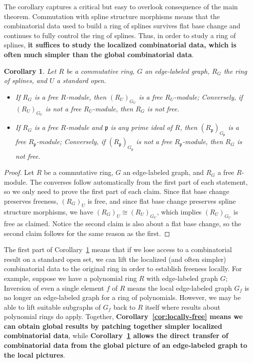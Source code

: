 \documentclass{article}
\newtheorem{corollary}{Corollary}
\begin{document}
The corollary captures a critical but easy to overlook consequence of the main theorem. Commutation with spline structure morphisms means that the combinatorial data used to build a ring of splines survives flat base change and continues to fully control the ring of splines. Thus, in order to study a ring of splines, \textbf{it suffices to study the localized combinatorial data, which is often much simpler than the global combinatorial data}.

\begin{corollary}
\label{cor:globally-free-implies-locally-free}
Let $R$ be a commutative ring, $G$ an edge-labeled graph, $R_G$ the ring of splines, and $U$ a standard open. 

\begin{itemize}
\item If $R_G$ is a free $R$-module, then $(R_U)_{G_U}$ is a free $R_U$-module; Conversely, if $(R_U)_{G_U}$ is not a free $R_U$-module, then $R_G$ is not free. 

\item If $R_G$ is a free $R$-module and $\mathfrak p$ is any prime ideal of $R$, then $(R_{\mathfrak p})_{G_{\mathfrak p}}$ is a free $R_{\mathfrak p}$-module; Conversely, if $(R_{\mathfrak p})_{G_{\mathfrak p}}$ is not a free $R_{\mathfrak p}$-module, then $R_G$ is not free.
\end{itemize}
\end{corollary}


\begin{proof}
Let $R$ be a commutative ring, $G$ an edge-labeled graph, and $R_G$ a free $R$-module. The converses follow automatically from the first part of each statement, so we only need to prove the first part of each claim. Since flat base change preserves freeness, $(R_G)_U$ is free, and since flat base change preserves spline structure morphisms, we have $(R_G)_U \cong (R_U)_{G_U}$, which implies $(R_U)_{G_U}$ is free as claimed. Notice the second claim is also about a flat base change, so the second claim follows for the same reason as the first. 
\end{proof}

The first part of Corollary~\ref{cor:globally-free-implies-locally-free} means that if we lose access to a combinatorial result on a standard open set, we can lift the localized (and often simpler) combinatorial data to the original ring in order to establish freeness locally. For example, suppose we have a polynomial ring $R$ with edge-labeled graph $G$; Inversion of even a single element $f$ of $R$ means the local edge-labeled graph $G_f$ is no longer an edge-labeled graph for a ring of polynomials. However, we may be able to lift suitable subgraphs of $G_f$ back to $R$ itself where results about polynomial rings do apply. Together, \textbf{Corollary~\ref{cor:locally-free} means we can obtain global results by patching together simpler localized combinatorial data}, while \textbf{Corollary~\ref{cor:globally-free-implies-locally-free} allows the direct transfer of combinatorial data from the global picture of an edge-labeled graph to the local pictures}.
\end{document}
